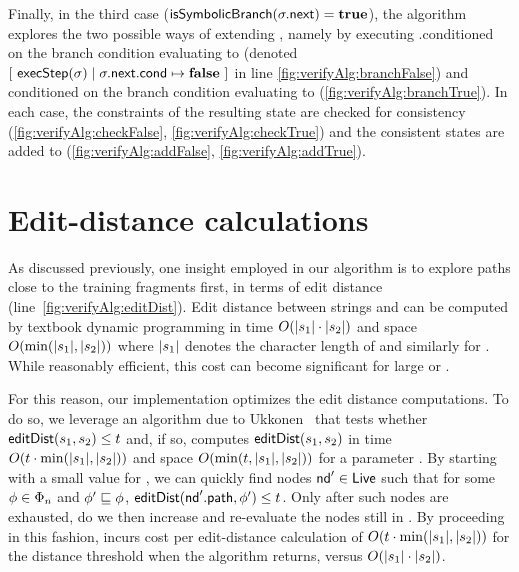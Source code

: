 Finally, in the third case
($\mathsf{isSymbolicBranch}(\sigma.\mathsf{next}) = \textbf{true}$), the
algorithm explores the two possible ways of extending \newPath, namely
by executing \newState.\nextInstruction conditioned on the branch
condition evaluating to \codeFalse (denoted $[~\mathsf{execStep}(\sigma)
\mid \sigma.\mathsf{next}.\mathsf{cond} \mapsto \textbf{false}~]$ in
line \ref{fig:verifyAlg:branchFalse}) and conditioned on the branch
condition evaluating to \codeTrue (\ref{fig:verifyAlg:branchTrue}).
In each case, the constraints of the resulting state are checked for
consistency (\ref{fig:verifyAlg:checkFalse},
\ref{fig:verifyAlg:checkTrue}) and the consistent states are added to
\liveSet (\ref{fig:verifyAlg:addFalse}, \ref{fig:verifyAlg:addTrue}).

\label{sec:guided:verification:refinements}

\section{Edit-distance calculations} 
As discussed previously, one insight employed in our \verifyAlg
algorithm is to explore paths close to the training fragments
\trainingFrags{\msgNmbr} first, in terms of edit distance
(line~\ref{fig:verifyAlg:editDist}).  Edit distance between strings
\stringOne and \stringTwo can be computed by textbook dynamic
programming in time $O(|s_1| \cdot |s_2|)$ and space
$O(\min(|s_1|, |s_2|))$ where $|s_1|$ denotes the
character length of \stringOne and similarly for \stringTwo.  While
reasonably efficient, this cost can become significant for large
\stringOne or \stringTwo.

For this reason, our implementation optimizes the edit distance
computations.  To do so, we leverage an algorithm due to
Ukkonen~\cite{ukkonen85:string} that tests whether
$\mathsf{editDist}(s_1, s_2) \le t$ and, if so,
computes $\mathsf{editDist}(s_1, s_2)$ in time
$O(t \cdot \min(|s_1|, |s_2|))$ and
space $O(\min(t, |s_1|, |s_2|))$ for a
parameter \editDistThreshold.  By starting with a small value for
\editDistThreshold, we can quickly find nodes $\mathsf{nd}' \in \mathsf{Live}$
such that for some $\phi \in \Phi_{n}$ and
$\phi' \sqsubseteq \phi$,
$\mathsf{editDist}(\mathsf{nd}'.\mathsf{path}, \phi') \le
t$.  Only after such nodes are exhausted, do we then
increase \editDistThreshold and re-evaluate the nodes still in
\liveSet.  By proceeding in this fashion, \verifyAlg incurs cost per
edit-distance calculation of $O(t \cdot
\min(|s_1|, |s_2|))$ for the distance threshold
\editDistThreshold when the algorithm returns, versus $O(|s_1|
\cdot |s_2|)$.

